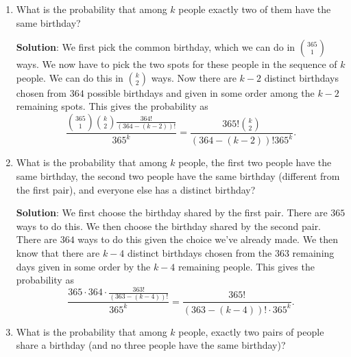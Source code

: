 \documentclass[11pt]{article}
\begin{document}
\begin{enumerate}
\begin{enumerate}
{\bf Solution}: We think of the probability as being given by the following process: We ask $k$ people in some order to say their birthdays.  We count the number of possible sequences of birthday where the first two are the same, nobody else has that birthday, and every other birthday is distinct, and divide by $365^k$, the total number of possible sequences.

We first pick the birthday shared by the first two people.  There are $\binom{365}{1}$ possible days.  We then know that the next $k-2$ people each have distinct birthdays chosen from the $364$ remaining days, giving $\frac{364!}{(364-(k-2))!}$ possible sequences.  This gives the probability as
\[
\frac{\binom{365}{1} \frac{364!}{(364-(k-2))!}}{365^k} = \frac{365!}{(364-(k-2))! 365^k}.
\]

\item What is the probability that among $k$ people exactly two of them have the same birthday?

{\bf Solution}: We first pick the common birthday, which we can do in $\binom{365}{1}$ ways.  We now have to pick the two spots for these people in the sequence of $k$ people.  We can do this in $\binom{k}{2}$ ways.  Now there are $k-2$ distinct birthdays chosen from $364$ possible birthdays and given in some order among the $k-2$ remaining spots.  This gives the probability as 
\[
\frac{\binom{365}{1} \binom{k}{2} \frac{364!}{(364-(k-2))!}}{365^k} = \frac{365! \binom{k}{2}}{(364-(k-2))! 365^k}.
\]

\item What is the probability that among $k$ people, the first two people have the same birthday, the second two people have the same birthday (different from the first pair), and everyone else has a distinct birthday?

{\bf Solution}:  We first choose the birthday shared by the first pair.  There are $365$ ways to do this.  We then choose the birthday shared by the second pair.  There are $364$ ways to do this given the choice we've already made. We then know that there are $k-4$ distinct birthdays chosen from the $363$ remaining days given in some order by the $k-4$ remaining people.  This gives the probability as
\[
\frac{365\cdot 364\cdot \frac{363!}{(363-(k-4))!}}{365^k} = \frac{365!}{ (363-(k-4))! \cdot 365^k}.
\]

\item What is the probability that among $k$ people, exactly two pairs of people share a birthday (and no three people have the same birthday)?


\end{enumerate}
\end{enumerate}
\end{document}
